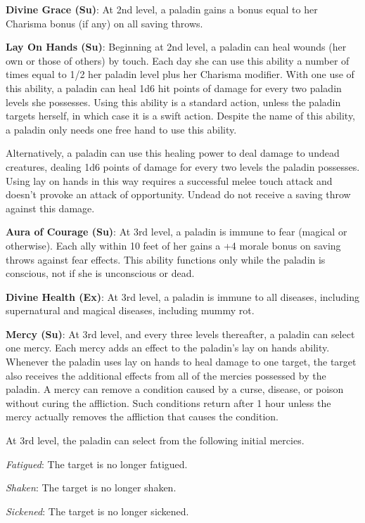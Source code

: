 \textbf{Divine Grace (Su)}: At 2nd level, a paladin gains a bonus equal to her Charisma bonus (if any) on all saving throws.
				
\textbf{Lay On Hands (Su)}: Beginning at 2nd level, a paladin can heal wounds (her own or those of others) by touch. Each day she can use this ability a number of times equal to 1/2 her paladin level plus her Charisma modifier. With one use of this ability, a paladin can heal 1d6 hit points of damage for every two paladin levels she possesses. Using this ability is a standard action, unless the paladin targets herself, in which case it is a swift action. Despite the name of this ability, a paladin only needs one free hand to use this ability.
				
Alternatively, a paladin can use this healing power to deal damage to undead creatures, dealing 1d6 points of damage for every two levels the paladin possesses. Using lay on hands in this way requires a successful melee touch attack and doesn't provoke an attack of opportunity. Undead do not receive a saving throw against this damage.
				
\textbf{Aura of Courage (Su)}: At 3rd level, a paladin is immune to fear (magical or otherwise). Each ally within 10 feet of her gains a +4 morale bonus on saving throws against fear effects. This ability functions only while the paladin is conscious, not if she is unconscious or dead.
				
\textbf{Divine Health (Ex)}: At 3rd level, a paladin is immune to all diseases, including supernatural and magical diseases, including mummy rot.
				
\textbf{Mercy (Su)}: At 3rd level, and every three levels thereafter, a paladin can select one mercy. Each mercy adds an effect to the paladin's lay on hands ability. Whenever the paladin uses lay on hands to heal damage to one target, the target also receives the additional effects from all of the mercies possessed by the paladin. A mercy can remove a condition caused by a curse, disease, or poison without curing the affliction. Such conditions return after 1 hour unless the mercy actually removes the affliction that causes the condition.
				
At 3rd level, the paladin can select from the following initial mercies. 
				
\textit{Fatigued}: The target is no longer fatigued.
				
\textit{Shaken}: The target is no longer shaken.
				
\textit{Sickened}: The target is no longer sickened. 
				
